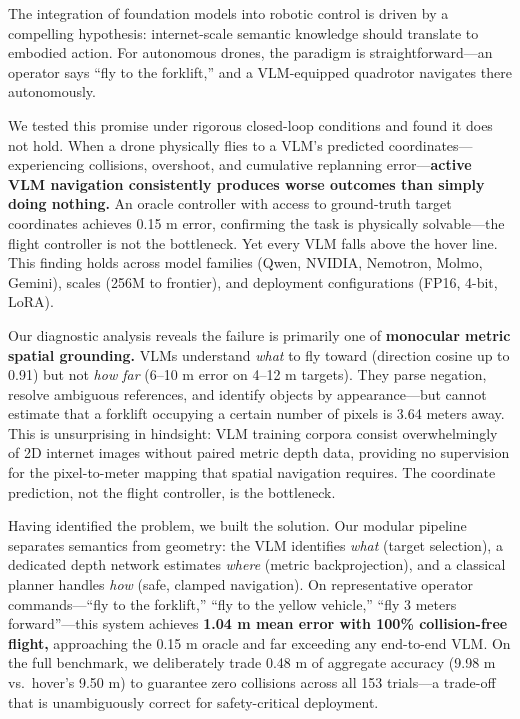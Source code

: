 \documentclass[conference]{IEEEtran}
\begin{document}
The integration of foundation models into robotic control is driven by a
compelling hypothesis: internet-scale semantic knowledge should
translate to embodied action. For autonomous drones, the paradigm is
straightforward---an operator says ``fly to the forklift,'' and a
VLM-equipped quadrotor navigates there autonomously.

We tested this promise under rigorous closed-loop conditions and found
it does not hold. When a drone physically flies to a VLM's predicted
coordinates---experiencing collisions, overshoot, and cumulative
replanning error---\textbf{active VLM navigation consistently produces
worse outcomes than simply doing nothing.} An oracle controller with
access to ground-truth target coordinates achieves 0.15 m error,
confirming the task is physically solvable---the flight controller is
not the bottleneck. Yet every VLM falls above the hover line. This
finding holds across model families (Qwen, NVIDIA, Nemotron, Molmo,
Gemini), scales (256M to frontier), and deployment configurations (FP16,
4-bit, LoRA).

Our diagnostic analysis reveals the failure is primarily one of
\textbf{monocular metric spatial grounding.} VLMs understand \emph{what}
to fly toward (direction cosine up to 0.91) but not \emph{how far}
(6--10 m error on 4--12 m targets). They parse negation, resolve
ambiguous references, and identify objects by appearance---but cannot
estimate that a forklift occupying a certain number of pixels is 3.64
meters away. This is unsurprising in hindsight: VLM training corpora
consist overwhelmingly of 2D internet images without paired metric depth
data, providing no supervision for the pixel-to-meter mapping that
spatial navigation requires. The coordinate prediction, not the flight
controller, is the bottleneck.

Having identified the problem, we built the solution. Our modular
pipeline separates semantics from geometry: the VLM identifies
\emph{what} (target selection), a dedicated depth network estimates
\emph{where} (metric backprojection), and a classical planner handles
\emph{how} (safe, clamped navigation). On representative operator
commands---``fly to the forklift,'' ``fly to the yellow vehicle,'' ``fly
3 meters forward''---this system achieves \textbf{1.04 m mean error with
100\% collision-free flight,} approaching the 0.15 m oracle and far
exceeding any end-to-end VLM. On the full benchmark, we deliberately
trade 0.48 m of aggregate accuracy (9.98 m vs.~hover's 9.50 m) to
guarantee zero collisions across all 153 trials---a trade-off that is
unambiguously correct for safety-critical deployment.
\end{document}
